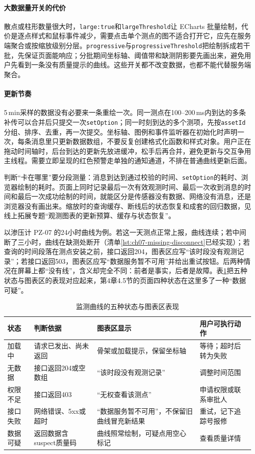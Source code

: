 \paragraph{大数据量开关的代价}散点或柱形数量很大时，\texttt{large:true}和\texttt{largeThreshold}让 ECharts 批量绘制，代价是逐点样式和鼠标事件减少，需要点击单个测点的图不适合打开它，应先在服务端聚合或按缩放级别分层。\texttt{progressive}与\texttt{progressiveThreshold}把绘制拆成若干批，先保证页面能响应；分批期间坐标轴、阈值带和缺测阴影要先画出来，避免用户先看到一条没有质量提示的曲线。这些开关都不改变数据，也都不能代替服务端聚合。

\paragraph{更新节奏}5\,min采样的数据没有必要来一条重绘一次。同一测点在100--200\,ms内到达的多条补传可以合并后只提交一次\texttt{setOption}；同一时刻到达的多个测项，先按\texttt{assetId}分组、排序、去重，再一次提交。坐标轴、图例和事件监听器在初始化时声明一次，每条消息里只更新数据数组，不要反复创建格式化函数和样式对象。用户正在拖动时间轴时，后台到达的更新先放进缓冲，松手后再合并，避免更新与交互争用主线程。需要立即呈现的红色预警走单独的通知通道，不排在普通曲线更新后面。

判断“卡在哪里”要分段测量：消息到达到通过校验的时间、\texttt{setOption}的耗时、浏览器绘制的耗时。页面上同时记录最后一次有效观测时间、最后一次收到消息的时间和最后一次成功绘制的时间，就能区分是传感器没有数据、网络没有消息，还是浏览器没有画出来。缩放时的查询缓存、断线后的状态恢复和成套的回归数据，见线上拓展专题“观测图表的更新预算、缓存与状态恢复”。

以渗压计 PZ-07 的24小时曲线为例。若这一天测点正常上报，曲线连续；若中间断了三小时，曲线在缺测处断开（清单\ref{lst:ch07-missing-disconnect}已经实现）；若查询的时间段落在测点安装之前，接口返回204，图表区应写“该时段没有观测记录”；若接口返回503，图表区应写“数据服务暂不可用”并给出重试按钮。后两种情况在屏幕上都“没有线”，含义却完全不同：前者是事实，后者是故障。表\ref{tab:ch07-chart-states}把五种状态与图表区的表现对应起来，第4章4.5节的页面四种状态在这里多了一种“数据可疑”。

\begin{table}[htbp]
\centering
\caption{监测曲线的五种状态与图表区表现}
\label{tab:ch07-chart-states}
\begin{tabular}{p{2.0cm}p{3.6cm}p{3.6cm}p{3.4cm}}
\toprule
状态 & 判断依据 & 图表区显示 & 用户可执行动作 \\
\midrule
加载中 & 请求已发出、尚未返回 & 骨架或加载提示，保留坐标轴 & 等待；超时后转为失败 \\
无数据 & 接口返回204或空数组 & “该时段没有观测记录” & 调整时间范围 \\
权限不足 & 接口返回403 & “无权查看该测点” & 申请权限或联系审批人 \\
接口失败 & 网络错误、5xx或超时 & “数据服务暂不可用”，不保留旧曲线冒充新结果 & 重试，记下追踪号报修 \\
数据可疑 & 返回数据含suspect质量码 & 曲线照常绘制，可疑点用空心标记 & 查看质量详情 \\
\bottomrule
\end{tabular}
\end{table}

